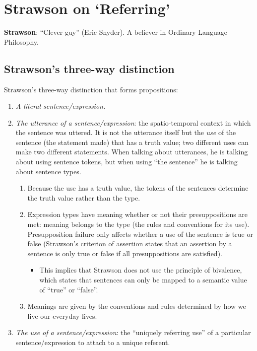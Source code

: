 \chapter{Strawson on `Referring'}

\textbf{Strawson}: ``Clever guy'' (Eric Snyder). A believer in Ordinary Language Philosophy.

\section{Strawson's three-way distinction}

Strawson's three-way distinction that forms propositions:
\begin{enumerate}[label=(\alph*)]
  \item \emph{A literal sentence/expression.}
  \item \emph{The utterance of a sentence/\allowbreak expression}: the spatio-temporal context in which the sentence was uttered. It is not the utterance itself but the \emph{use} of the sentence (the statement made) that has a truth value; two different uses can make two different statements. When talking about utterances, he is talking about using sentence tokens, but when using ``the sentence'' he is talking about sentence types.
  \begin{enumerate}[label=\roman*.]
    \item Because the use has a truth value, the tokens of the sentences determine the truth value rather than the type.
    \item Expression types have meaning whether or not their presuppositions are met: meaning belongs to the type (the rules and conventions for its use). Presupposition failure only affects whether a use of the sentence is true or false (Strawson's criterion of assertion states that an assertion by a sentence is only true or false if all presuppositions are satisfied).
    \begin{itemize}
      \item This implies that Strawson does not use the principle of bivalence, which states that sentences can only be mapped to a semantic value of ``true'' or ``false''.
    \end{itemize}
    \item Meanings are given by the conventions and rules determined by how we live our everyday lives.
  \end{enumerate}
  \item \emph{The use of a sentence/\allowbreak expression}: the ``uniquely referring use'' of a particular sentence/\allowbreak expression to attach to a unique referent.
\end{enumerate}

